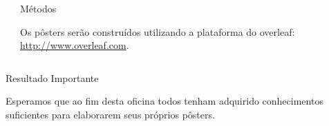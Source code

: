 \documentclass[final]{beamer}
\newlength{\onecolwid}
\newlength{\twocolwid}
\begin{document}
\begin{frame}[t]
\begin{columns}[t]
\begin{column}{\twocolwid}
\begin{columns}[t,totalwidth=\twocolwid]
\begin{column}{\onecolwid}

\end{column} %

\begin{column}{\onecolwid}\vspace{-.6in} %


\begin{block}{Métodos}

\vspace{2.0cm}

{\Large

Os pôsters serão construídos utilizando a plataforma do overleaf: \url{http://www.overleaf.com}.

}

\end{block}


\end{column} %

\end{columns} %



\begin{alertblock}{Resultado Importante}

{\Large

\begin{center}

Esperamos que ao fim desta oficina todos tenham adquirido conhecimentos suficientes para elaborarem seus próprios pôsters.

\end{center}

}
\end{alertblock}
\end{column}
\end{columns}
\end{frame}
\end{document}
